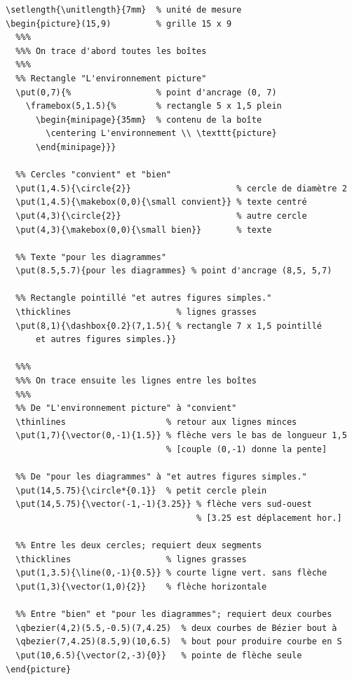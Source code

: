 \begingroup
  \small
\begin{lstlisting}
\setlength{\unitlength}{7mm}  % unité de mesure
\begin{picture}(15,9)         % grille 15 x 9
  %%%
  %%% On trace d'abord toutes les boîtes
  %%%
  %% Rectangle "L'environnement picture"
  \put(0,7){%                 % point d'ancrage (0, 7)
    \framebox(5,1.5){%        % rectangle 5 x 1,5 plein
      \begin{minipage}{35mm}  % contenu de la boîte
        \centering L'environnement \\ \texttt{picture}
      \end{minipage}}}

  %% Cercles "convient" et "bien"
  \put(1,4.5){\circle{2}}                     % cercle de diamètre 2
  \put(1,4.5){\makebox(0,0){\small convient}} % texte centré
  \put(4,3){\circle{2}}                       % autre cercle
  \put(4,3){\makebox(0,0){\small bien}}       % texte

  %% Texte "pour les diagrammes"
  \put(8.5,5.7){pour les diagrammes} % point d'ancrage (8,5, 5,7)

  %% Rectangle pointillé "et autres figures simples."
  \thicklines                     % lignes grasses
  \put(8,1){\dashbox{0.2}(7,1.5){ % rectangle 7 x 1,5 pointillé
      et autres figures simples.}}

  %%%
  %%% On trace ensuite les lignes entre les boîtes
  %%%
  %% De "L'environnement picture" à "convient"
  \thinlines                    % retour aux lignes minces
  \put(1,7){\vector(0,-1){1.5}} % flèche vers le bas de longueur 1,5
                                % [couple (0,-1) donne la pente]

  %% De "pour les diagrammes" à "et autres figures simples."
  \put(14,5.75){\circle*{0.1}}  % petit cercle plein
  \put(14,5.75){\vector(-1,-1){3.25}} % flèche vers sud-ouest
                                      % [3.25 est déplacement hor.]

  %% Entre les deux cercles; requiert deux segments
  \thicklines                   % lignes grasses
  \put(1,3.5){\line(0,-1){0.5}} % courte ligne vert. sans flèche
  \put(1,3){\vector(1,0){2}}    % flèche horizontale

  %% Entre "bien" et "pour les diagrammes"; requiert deux courbes
  \qbezier(4,2)(5.5,-0.5)(7,4.25)  % deux courbes de Bézier bout à
  \qbezier(7,4.25)(8.5,9)(10,6.5)  % bout pour produire courbe en S
  \put(10,6.5){\vector(2,-3){0}}   % pointe de flèche seule
\end{picture}
\end{lstlisting}
\endgroup


